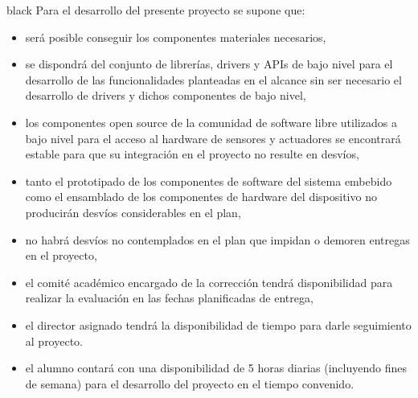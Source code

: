 \documentclass[
11pt, %
codirector, %
]{charter}
\begin{document}
\begin{consigna}{black}
Para el desarrollo del presente proyecto se supone que: 

\begin{itemize}
	\item será posible conseguir los componentes materiales necesarios,
	\item se dispondrá del conjunto de librerías, drivers y APIs de bajo nivel para el desarrollo de las funcionalidades planteadas en el alcance sin ser necesario el desarrollo de drivers y dichos componentes de bajo nivel,
	\item los componentes open source de la comunidad de software libre utilizados a bajo nivel para el acceso al hardware de sensores y actuadores se encontrará estable para que su integración en el proyecto no resulte en desvíos,	
	\item tanto el prototipado de los componentes de software del sistema embebido como el ensamblado de los componentes de hardware del dispositivo no producirán desvíos considerables en el plan,
	\item no habrá desvíos no contemplados en el plan que impidan o demoren entregas en el proyecto,
	\item el comité académico encargado de la corrección tendrá disponibilidad para realizar la evaluación en las fechas planificadas de entrega,
	\item el director asignado tendrá la disponibilidad de tiempo para darle seguimiento al proyecto.
	\item el alumno contará con una disponibilidad de 5 horas diarias (incluyendo fines de semana) para el desarrollo del proyecto en el tiempo convenido.
\end{itemize}


\end{consigna}
\end{document}
